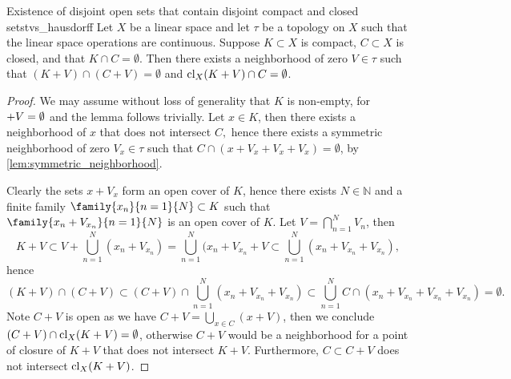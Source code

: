 \begin{lemma}{Existence of disjoint open sets that contain disjoint compact and closed sets}{tvs_hausdorff}
    Let \(X\) be a linear space and let \(\tau\) be a topology on \(X\) such that the linear space operations are continuous. Suppose \(K \subset X\) is compact, \(C \subset X\) is closed, and that \(K \cap C = \emptyset\). Then there exists a neighborhood of zero \(V \in \tau\) such that \((K + V) \cap (C + V) = \emptyset\) and \(\operatorname{cl}_X(K+V) \cap C = \emptyset\).
\end{lemma}
\begin{proof}
    We may assume without loss of generality that \(K\) is non-empty, for \(\empty + V = \emptyset\) and the lemma follows trivially. Let \(x \in K\), then there exists a neighborhood of \(x\) that does not intersect \(C,\) hence there exists a symmetric neighborhood of zero \(V_x \in \tau\) such that \(C \cap (x + V_x + V_x + V_x) = \emptyset\), by \cref{lem:symmetric_neighborhood}.

    Clearly the sets \(x + V_x\) form an open cover of \(K\), hence there exists \(N \in \mathbb{N}\) and a finite family \(\family{x_n}{n = 1}{N} \subset K\) such that \(\family{x_n + V_{x_n}}{n = 1}{N}\) is an open cover of \(K\). Let \(V = \bigcap_{n = 1}^{N} V_n\), then
    \begin{equation*}
        K + V \subset V + \bigcup_{n = 1}^N (x_n + V_{x_n}) = \bigcup_{n = 1}^N (x_n + V_{x_n} + V \subset \bigcup_{n = 1}^N (x_n + V_{x_n} + V_{x_n}),
    \end{equation*}
    hence
    \begin{equation*}
        (K + V)\cap(C + V) \subset (C + V) \cap \bigcup_{n = 1}^N (x_n + V_{x_n} + V_{x_n}) \subset \bigcup_{n = 1}^{N} C \cap (x_n + V_{x_n} + V_{x_n} + V_{x_n}) = \emptyset.
    \end{equation*} 
    Note \(C + V\) is open as we have \(C + V = \bigcup_{x \in C} (x + V)\), then we conclude \((C + V) \cap \operatorname{cl}_{X}(K + V) = \emptyset\), otherwise \(C + V\) would be a neighborhood for a point of closure of \(K + V\) that does not intersect \(K + V\). Furthermore, \(C \subset C + V\) does not intersect \(\operatorname{cl}_{X}(K+V)\).
\end{proof}

